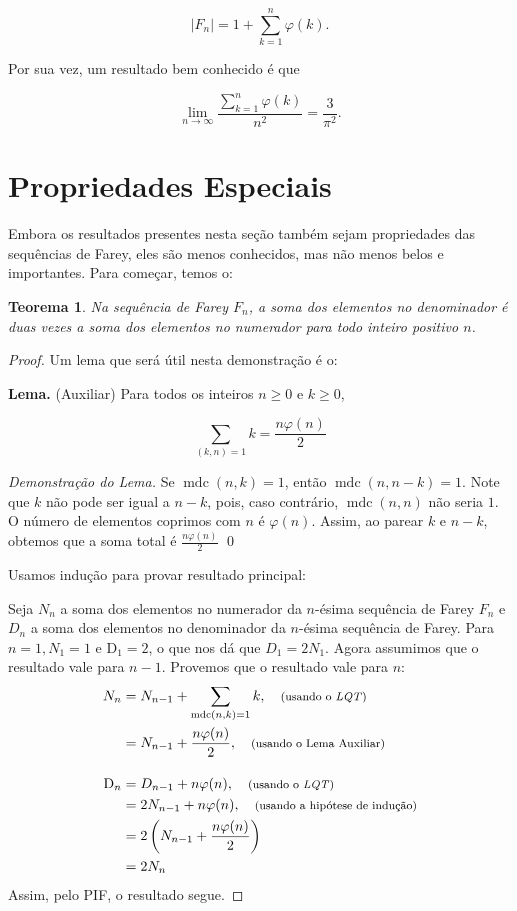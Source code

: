 \documentclass{hipatia}
\newtheorem*{theorem*}{Teorema}
\theoremstyle{definition} %
\begin{document}
$$
\left|F_n\right| = 1 + \sum_{k=1}^{n} \varphi(k).
$$

Por sua vez, um resultado bem conhecido é que 


$$\lim _{n \rightarrow \infty} \frac{\sum_{k=1}^{n} \varphi(k)}{n^2}=\frac{3}{\pi^2}.$$



\section{Propriedades Especiais}

Embora os resultados presentes nesta seção também sejam propriedades das sequências de Farey, eles são menos conhecidos, mas não menos belos e importantes. Para começar, temos o:
\begin{theorem*}
Na sequência de Farey \(F_{n}\), a soma dos elementos no denominador é duas vezes a soma dos elementos no numerador para todo inteiro positivo \(n\).
\end{theorem*} 
\begin{proof}
Um lema que será útil nesta demonstração é o:

\noindent \textbf{Lema.} (Auxiliar)
    Para todos os inteiros \(n \geq 0\) e \(k \geq 0\),

\[
\sum_{(k, n)=1} k=\frac{n \varphi(n)}{2}
\]


\noindent \textit{Demonstração do Lema.} Se \(\operatorname{mdc}(n, k)=1\), então \(\operatorname{mdc}(n, n-k)=1\). Note que \(k\) não pode ser igual a \(n-k\), pois, caso contrário, \(\operatorname{mdc}(n, n)\) não seria \(1\). O número de elementos coprimos com \(n\) é \(\varphi(n)\). Assim, ao parear \(k\) e \(n-k\), obtemos que a soma total é \(\frac{n \varphi(n)}{2}\)
\qed

    Usamos indução para provar resultado principal:
    
    Seja \(N_{n}\) a soma dos elementos no numerador da \(n\)-ésima sequência de Farey \(F_{n}\) e \(D_{n}\) a soma dos elementos no denominador da \(n\)-ésima sequência de Farey. Para \(n=1, N_{1}=1\) e \(\mathrm{D}_{1}=2\), o que nos dá que
\(D_{1}=2 N_{1}\). Agora assumimos que o resultado vale para \(n-1\). Provemos que o resultado vale para \(n\):
\begin{align*}
N_{n} &= N_{n-1} + \sum_{\operatorname{mdc}(n, k) = 1} k, \quad \text{\footnotesize (usando o \textit{LQT})} \\
&= N_{n-1} + \frac{n \varphi(n)}{2}, \quad \text{\footnotesize (usando o Lema Auxiliar)} \\[10pt]
\mathrm{D}_{n} &= D_{n-1} + n \varphi(n), \quad \text{\footnotesize (usando o \textit{LQT})} \\
&= 2 N_{n-1} + n \varphi(n), \quad \text{\footnotesize (usando a hipótese de indução)} \\
&= 2 \left( N_{n-1} + \frac{n \varphi(n)}{2} \right) \\
&= 2 N_{n}
\end{align*}
Assim, pelo PIF, o resultado segue.
\end{proof} 
\end{document}
